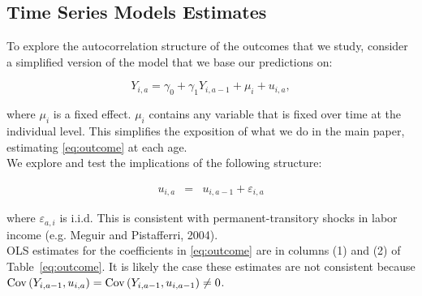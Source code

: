


\usepackage[stable]{footmisc}

\newcommand*\leftright[2]{%
  \leavevmode
  \rlap{#1}%
  \hspace{0.5\linewidth}%
  #2}

\newcommand{\orth}{\ensuremath{\perp\!\!\!\perp}}%
\newcommand{\indep}{\orth}%
\newcommand{\notorth}{\ensuremath{\perp\!\!\!\!\!\!\diagup\!\!\!\!\!\!\perp}}%
\newcommand{\notindep}{\notorth}







\doublespacing

\subsection{Time Series Models Estimates} \label{appendix:tseries}

\noindent To explore the autocorrelation structure of the outcomes that we study, consider a simplified version of the model that we base our predictions on:

\begin{equation}
Y_{i,a} = \gamma_{0} + \gamma_{1} Y_{i,a-1} + \mu_{i} + u_{i,a}, \label{eq:outcome}
\end{equation}

\noindent where  $\mu_{i}$ is a fixed effect. $\mu_{i}$ contains any variable that is fixed over time at the individual level. This simplifies the exposition of what we do in the main paper, estimating \eqref{eq:outcome} at each age.\\


\noindent We explore and test the implications of the following structure: 

\begin{eqnarray}
u_{i,a}        &=& u_{i,a-1} + \varepsilon_{i,a} \label{eq:error}
\end{eqnarray}

\noindent where $\varepsilon_{a,i}$ is i.i.d. This is consistent with permanent-transitory shocks in labor income (e.g. Meguir and Pistafferri, 2004).\\

\noindent OLS estimates for the coefficients in \eqref{eq:outcome} are in columns (1) and (2) of Table~\ref{eq:outcome}. It is likely the case these estimates are not consistent because $\operatorname{Cov} \left( Y_{i,a-1}, u_{i,a} \right) = \operatorname{Cov} \left( Y_{i,a-1}, u_{i,a-1} \right) \neq 0$.\\

